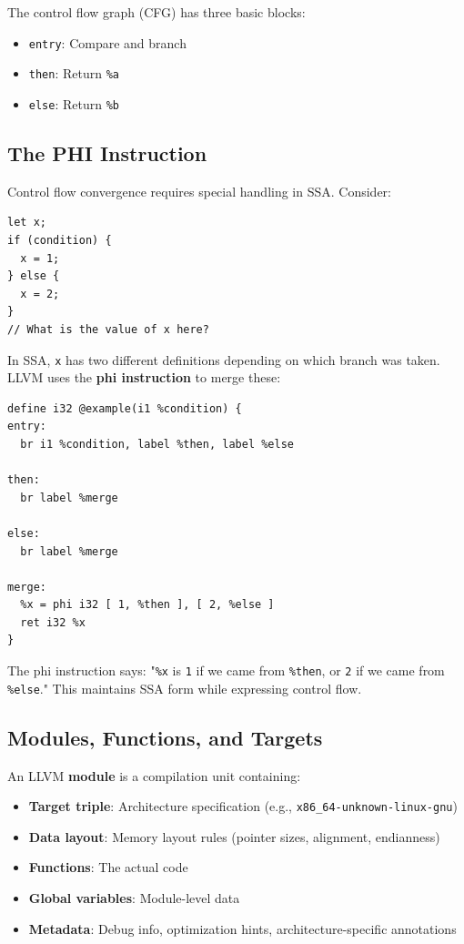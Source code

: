 \documentclass[11pt]{article}
\begin{document}
The control flow graph (CFG) has three basic blocks:
\begin{itemize}[noitemsep]
  \item \texttt{entry}: Compare and branch
  \item \texttt{then}: Return \texttt{\%a}
  \item \texttt{else}: Return \texttt{\%b}
\end{itemize}

\subsection{The PHI Instruction}
Control flow convergence requires special handling in SSA. Consider:
\begin{lstlisting}[style=ts]
let x;
if (condition) {
  x = 1;
} else {
  x = 2;
}
// What is the value of x here?
\end{lstlisting}

In SSA, \texttt{x} has two different definitions depending on which branch was taken. LLVM uses the \textbf{phi instruction} to merge these:

\begin{lstlisting}[style=ir]
define i32 @example(i1 %condition) {
entry:
  br i1 %condition, label %then, label %else

then:
  br label %merge

else:
  br label %merge

merge:
  %x = phi i32 [ 1, %then ], [ 2, %else ]
  ret i32 %x
}
\end{lstlisting}

The phi instruction says: "\texttt{\%x} is \texttt{1} if we came from \texttt{\%then}, or \texttt{2} if we came from \texttt{\%else}." This maintains SSA form while expressing control flow.

\subsection{Modules, Functions, and Targets}
An LLVM \textbf{module} is a compilation unit containing:
\begin{itemize}[noitemsep]
  \item \textbf{Target triple}: Architecture specification (e.g., \texttt{x86\_64-unknown-linux-gnu})
  \item \textbf{Data layout}: Memory layout rules (pointer sizes, alignment, endianness)
  \item \textbf{Functions}: The actual code
  \item \textbf{Global variables}: Module-level data
  \item \textbf{Metadata}: Debug info, optimization hints, architecture-specific annotations
\end{itemize}
\end{document}
